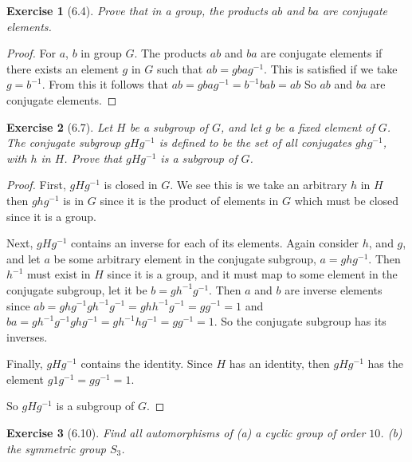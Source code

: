 \documentclass[12pt,leqno]{article}
\numberwithin{equation}{section}
\newtheorem*{exer}{Exercise}
\theoremstyle{definition}
\begin{document}
\begin{exer}[6.4]Prove that in a group, the products $ab$ and $ba$ are conjugate elements.
\end{exer}

\begin{proof}[Proof]

    For $a$, $b$ in group $G$. The products $ab$ and $ba$ are conjugate
    elements if there exists an element $g$ in $G$ such that $ab = gbag^{-1}$.
    This is satisfied if we take $g = b^{-1}$. From this it follows that $ab =
    gbag^{-1} = b^{-1}bab = ab$ So $ab$ and $ba$ are conjugate elements.

\end{proof}


\begin{exer}[6.7]
Let $H$ be a subgroup of $G$, and let $g$ be a fixed element of $G$. The \emph{conjugate subgroup} $gHg^{-1}$ is defined to be the set of all conjugates $ghg^{-1}$, with $h$ in $H$. Prove that $gHg^{-1}$ is a subgroup of $G$. 
\end{exer}

\begin{proof}[Proof]

    First, $gHg^{-1}$ is closed in $G$. We see this is we take an arbitrary $h$
    in $H$ then $ghg^{-1}$ is in $G$ since it is the product of elements in $G$
    which must be closed since it is a group.

    Next, $gHg^{-1}$ contains an inverse for each of its elements. Again
    consider $h$, and $g$, and let $a$ be some arbitrary element in the
    conjugate subgroup, $a = ghg^{-1}$. Then $h^{-1}$ must exist in $H$ since
    it is a group, and it must map to some element in the conjugate subgroup,
    let it be $b = gh^{-1}g^{-1}$. Then $a$ and $b$ are inverse elements since
    $ab = ghg^{-1}gh^{-1}g^{-1} = ghh^{-1}g^{-1} = gg^{-1} = 1$ and $ba =
    gh^{-1}g^{-1}ghg^{-1} = gh^{-1}hg^{-1} = gg^{-1} = 1$. So the conjugate
    subgroup has its inverses.

    Finally, $gHg^{-1}$ contains the identity. Since $H$ has an identity, then
    $gHg^{-1}$ has the element $g1g^{-1} = gg^{-1} = 1$. 

    So $gHg^{-1}$ is a subgroup of $G$.

\end{proof}


\begin{exer}[6.10]Find all automorphisms of (a) a cyclic group of order $10$. (b) the symmetric group $S_3$.

\end{exer}
\end{document}
